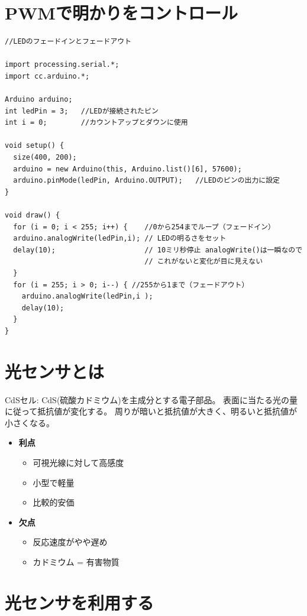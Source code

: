 \documentclass[11pt,a4paper]{jarticle}
\begin{document}
\section{PWMで明かりをコントロール}
\begin{lstlisting}
//LEDのフェードインとフェードアウト

import processing.serial.*;
import cc.arduino.*;
 
Arduino arduino;
int ledPin = 3;   //LEDが接続されたピン
int i = 0;        //カウントアップとダウンに使用
 
void setup() {
  size(400, 200);
  arduino = new Arduino(this, Arduino.list()[6], 57600);
  arduino.pinMode(ledPin, Arduino.OUTPUT);   //LEDのピンの出力に設定
}

void draw() {
  for (i = 0; i < 255; i++) {    //0から254までループ（フェードイン）
  arduino.analogWrite(ledPin,i); // LEDの明るさをセット
  delay(10);                     // 10ミリ秒停止 analogWrite()は一瞬なので
                                 // これがないと変化が目に見えない  
  }
  for (i = 255; i > 0; i--) { //255から1まで（フェードアウト）
    arduino.analogWrite(ledPin,i );
    delay(10);
  }
}
\end{lstlisting}

\section{光センサとは}
CdSセル: CdS(硫酸カドミウム)を主成分とする電子部品。
表面に当たる光の量に従って抵抗値が変化する。
周りが暗いと抵抗値が大きく、明るいと抵抗値が小さくなる。

\begin{itemize}
 \item \textbf{利点}
       \begin{itemize}
	\item 可視光線に対して高感度
	\item 小型で軽量
	\item 比較的安価
       \end{itemize}
 \item \textbf{欠点}
       \begin{itemize}
	\item 反応速度がやや遅め
	\item カドミウム = 有害物質
       \end{itemize}
\end{itemize}


\section{光センサを利用する}
\end{document}
